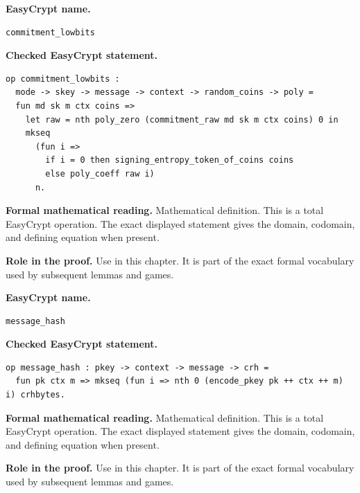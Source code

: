 \begin{formaldefinition}
\noindent\textbf{EasyCrypt name.}
\begin{lstlisting}[language=EasyCrypt,basicstyle=\ttfamily\scriptsize]
commitment_lowbits
\end{lstlisting}
\noindent\textbf{Checked EasyCrypt statement.}
\begin{lstlisting}[language=EasyCrypt,basicstyle=\ttfamily\scriptsize]
op commitment_lowbits :
  mode -> skey -> message -> context -> random_coins -> poly =
  fun md sk m ctx coins =>
    let raw = nth poly_zero (commitment_raw md sk m ctx coins) 0 in
    mkseq
      (fun i =>
        if i = 0 then signing_entropy_token_of_coins coins
        else poly_coeff raw i)
      n.
\end{lstlisting}
\noindent\textbf{Formal mathematical reading.}
Mathematical definition. This is a total EasyCrypt operation.  The exact displayed statement gives the domain, codomain, and defining equation when present.

\noindent\textbf{Role in the proof.}
Use in this chapter. It is part of the exact formal vocabulary used by subsequent lemmas and games.

\end{formaldefinition}

\begin{formaldefinition}
\noindent\textbf{EasyCrypt name.}
\begin{lstlisting}[language=EasyCrypt,basicstyle=\ttfamily\scriptsize]
message_hash
\end{lstlisting}
\noindent\textbf{Checked EasyCrypt statement.}
\begin{lstlisting}[language=EasyCrypt,basicstyle=\ttfamily\scriptsize]
op message_hash : pkey -> context -> message -> crh =
  fun pk ctx m => mkseq (fun i => nth 0 (encode_pkey pk ++ ctx ++ m) i) crhbytes.
\end{lstlisting}
\noindent\textbf{Formal mathematical reading.}
Mathematical definition. This is a total EasyCrypt operation.  The exact displayed statement gives the domain, codomain, and defining equation when present.

\noindent\textbf{Role in the proof.}
Use in this chapter. It is part of the exact formal vocabulary used by subsequent lemmas and games.

\end{formaldefinition}

